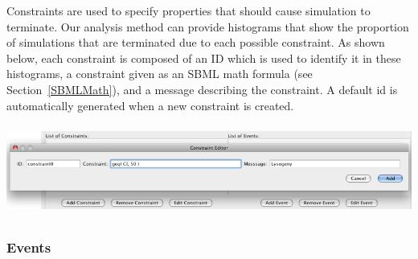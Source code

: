 \documentclass[titlepage,11pt]{article}
\begin{document}
\noindent
Constraints are used to specify properties that should cause
simulation to terminate.  Our analysis method can provide histograms 
that show the proportion of simulations that are terminated due to each
possible constraint.  As shown below, 
each constraint is composed of an ID which is
used to identify it in these histograms, a constraint given as an 
SBML math formula (see Section~\ref{SBMLMath}), and a message 
describing the constraint.  A default id is automatically generated 
when a new constraint is created.
\begin{center}
\includegraphics[height=30mm]{screenshots/constraint}
\end{center}

\subsubsection{\label{events}Events}
\end{document}
